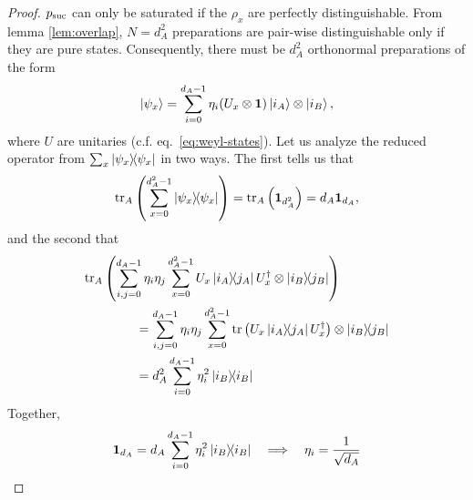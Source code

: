     \selftest*
    \begin{proof}
        $p_{\text{suc}}$ can only be saturated if the $\rho_x$ are perfectly distinguishable. From lemma \ref{lem:overlap}, $N = d_A^2$ preparations are pair-wise distinguishable only if they are pure states. Consequently, there must be $d_A^2$ orthonormal preparations of the form
        $$
            \ket{\psi_x} = \sum_{i = 0}^{d_A - 1} \eta_i (U_x \otimes \mathbf{1}) \ket{i_A} \otimes \ket{i_B} ,
        $$
        where $U$ are unitaries (c.f. eq.~\eqref{eq:weyl-states}). Let us analyze the reduced operator from $\sum_x \ketbra{\psi_x}{\psi_x}$ in two ways. The first tells us that
        $$
            \text{tr}_{A}\left( \sum_{x=0}^{d_A^2 - 1} \ketbra{\psi_x}{\psi_x} \right) = \text{tr}_{A}\left( \mathbf{1}_{d_A^2} \right) = d_A \mathbf{1}_{d_A} ,
        $$
        and the second that
        \begin{align*}
            &\text{tr}_{A}\left( \sum_{i,j=0}^{d_A - 1} \eta_i \eta_j \sum_{x=0}^{d_A^2 - 1} U_x \ketbra{i_A}{j_A} U_x^\dagger \otimes \ketbra{i_B}{j_B} \right) \\
            &\qquad\qquad = \sum_{i,j=0}^{d_A - 1} \eta_i \eta_j \sum_{x=0}^{d_A^2 - 1} \text{tr}\left( U_x \ketbra{i_A}{j_A} U_x^\dagger \right) \otimes \ketbra{i_B}{j_B} \\
            &\qquad\qquad = d_A^2 \sum_{i=0}^{d_A - 1} \eta_i^2 \ketbra{i_B}{i_B}
        \end{align*}
        Together,
        $$
            \mathbf{1}_{d_A} = d_A \sum_{i=0}^{d_A-1} \eta_i^2 \ketbra{i_B}{i_B} \quad\Longrightarrow\quad \eta_i = \frac{1}{\sqrt{d_A}}
        $$
    \end{proof}


